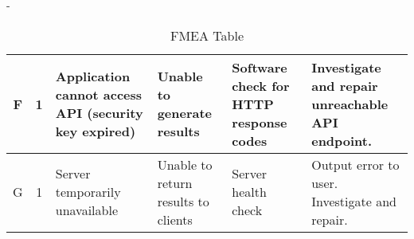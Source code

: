 \documentclass{article}
\begin{document}
\begin{table}[H]
\begin{adjustwidth}{-\oddsidemargin}{}
\begin{tabularx}{1.45\textwidth}{|c|c|X|X|X|X|}
        F & 1 & Application cannot access API (security key expired) & Unable to generate results & Software check for HTTP response codes & Investigate and repair unreachable API endpoint.\\ \hline
        G & 1 & Server temporarily unavailable & Unable to return results to clients & Server health check & Output error to user. Investigate and repair. \\ \hline
    \end{tabularx}
    \caption{FMEA Table}
    \label{tab:FMEA}
    \end{adjustwidth}
\end{table}
\end{document}
